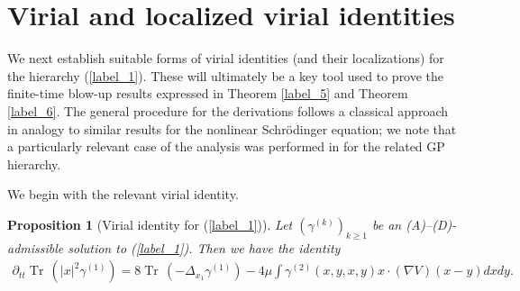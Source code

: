 \documentclass[reqno]{amsart}
\numberwithin{equation}{section}
\newtheorem{proposition}[theorem]{Proposition}
\theoremstyle{remark}
\DeclareMathOperator{\Tr}{Tr\,}
\begin{document}
\section{Virial and localized virial identities}

We next establish suitable forms of virial identities (and their localizations) for the hierarchy (\ref{label_1}).  These will ultimately be a key tool used to prove the finite-time blow-up results expressed in Theorem \ref{label_5} and Theorem \ref{label_6}.  The general procedure for the derivations follows a classical approach in analogy to similar results for the nonlinear Schr\"odinger equation; we note that a particularly relevant case of the analysis was performed in \cite{CPT} for the related GP hierarchy.

We begin with the relevant virial identity.

\begin{proposition}[Virial identity for (\ref{label_1})]
\label{label_29}
Let $(\gamma^{(k)})_{k\geq 1}$ be an (A)--(D)-admissible solution to (\ref{label_1}).  Then we have the identity
\begin{align*}
\partial_{tt}\Tr(|x|^2\gamma^{(1)})=8\Tr(-\Delta_{x_1}\gamma^{(1)})-4\mu \int \gamma^{(2)}(x,y,x,y)x\cdot (\nabla V)(x-y)dxdy.
\end{align*}
\end{proposition}
\end{document}
